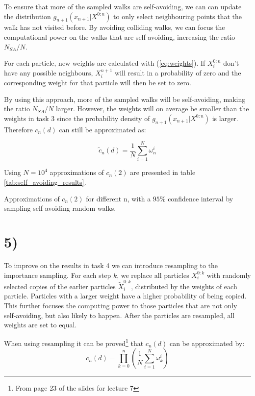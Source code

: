 \documentclass[a4paper]{article}
\begin{document}
To ensure that more of the sampled walks are self-avoiding, we can can update the distribution $g_{n+1}(x_{n+1}|X^{0:n})$ to only select neighbouring points that the walk has not visited before. By avoiding colliding walks, we can focus the computational power on the walks that are self-avoiding, increasing the ratio $N_{SA}/N$. 

For each particle, new weights are calculated with (\ref{eq:weights}). If $X_i^{0:n}$ don't have any possible neighbours, $X_i^{n+1}$ will result in a probability of zero and the corresponding weight for that particle will then be set to zero.

By using this approach, more of the sampled walks will be self-avoiding, making the ratio $N_{SA}/N$ larger. However, the weights will on average be smaller than the weights in task 3 since the probability density of $g_{n+1}(x_{n+1}|X^{0:n})$ is larger. Therefore $c_n(d)$ can still be approximated as:

\begin{equation}
    \tilde{c}_n(d) = \frac{1}{N}\sum_{i=1}^N\omega_n^i
\end{equation}

Using $N = 10^4$ approximations of $c_n(2)$ are presented in table \ref{tab:self_avoiding_results}.

\begin{table}[H]
    \centering
    \caption{Approximations of $c_n(2)$ for different n, with a $95\%$ confidence interval by sampling self avoiding random walks.}
    \label{tab:self_avoiding_results}
    
\end{table}

\section*{5)}
To improve on the results in task 4 we can introduce resampling to the importance sampling. For each step $k$, we replace all particles $X_i^{0:k}$ with randomly selected copies of the earlier particles $\widetilde{X}_i^{0:k}$, distributed by the weights of each particle. Particles with a larger weight have a higher probability of being copied. This further focuses the computing power to those particles that are not only self-avoiding, but also likely to happen. After the particles are resampled, all weights are set to equal.

When using resampling it can be proved\footnote{From page 23 of the slides for lecture 7} that $c_n(d)$ can be approximated by:
\begin{equation}
    c_n(d) = \prod_{k = 0}^n(\frac{1}{N}\sum_{i=1}^N\omega_k^i)
\end{equation}
\end{document}
